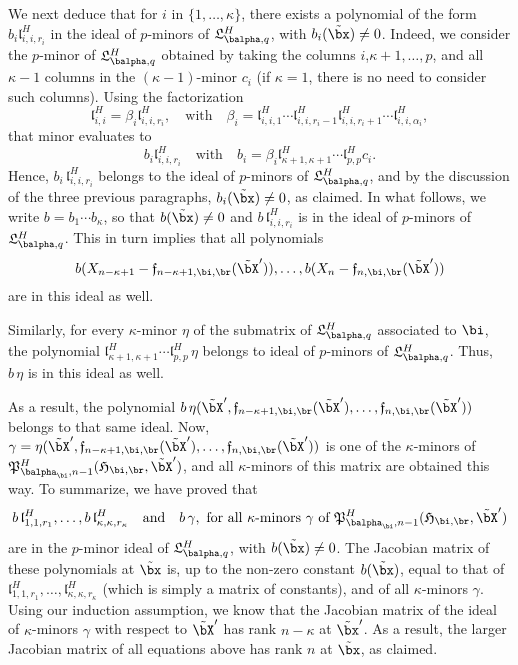 \documentclass[12pt]{article}
\begin{document}
We next deduce that for $i$ in $\{1,\dots,\kappa\}$, there exists a
polynomial of the form $b_{i} \mathfrak{l}^H_{i,i,r_i}$ in the ideal
of $p$-minors of $\mathfrak{L}^H_{\balpha,q}$, with
$b_{i}(\tilde\bx)\ne 0$. Indeed, we consider the $p$-minor of
$\mathfrak{L}^H_{\balpha,q}$ obtained by taking the columns
$i$,$\kappa+1,\dots,p$, and all $\kappa-1$ columns in the
$(\kappa-1)$-minor $c_i$ (if $\kappa=1$, there is no need to consider
such columns). Using the factorization
$$\mathfrak{l}^H_{i,i} = \beta_i \mathfrak{l}^H_{i,i,r_i},\quad\text{with}\quad
\beta_i=\mathfrak{l}^H_{i,i,1}\cdots \mathfrak{l}^H_{i,i,r_i-1}\mathfrak{l}^H_{i,i,r_i+1}\cdots \mathfrak{l}^H_{i,i,\alpha_i},$$
that minor evaluates to 
$$b_i \mathfrak{l}^H_{i,i,r_i}\quad\text{with}\quad b_i = \beta_i
\mathfrak{l}^H_{\kappa+1,\kappa+1}\cdots \mathfrak{l}^H_{p,p}c_i.$$
Hence, $b_i\, \mathfrak{l}^H_{i,i,r_i}$ belongs to the ideal of
$p$-minors of $\mathfrak{L}^H_{\balpha,q}$, and by the discussion of
the three previous paragraphs, $b_i(\tilde\bx)\ne 0$, as claimed. In
what follows, we write $b=b_1 \cdots b_\kappa$, so that $b(\tilde\bx)
\ne 0$ and $b\, \mathfrak{l}^H_{i,i,r_i}$ is in
the ideal of $p$-minors of 
$\mathfrak{L}^H_{\balpha,q}$.  This in turn implies that all
polynomials
$$
b(X_{n-\kappa+1}-\mathfrak{f}_{n-\kappa+1,\bi,\br}(\tilde\bX')),\dots,b(X_{n}-\mathfrak{f}_{n,\bi,\br}(\tilde\bX'))
$$ are in this ideal as well.

Similarly, for every $\kappa$-minor $\eta$ of the submatrix of
$\mathfrak{L}^H_{\balpha,q}$ associated to $\bi$, the polynomial
$\mathfrak{l}^H_{\kappa+1,\kappa+1}\cdots \mathfrak{l}^H_{p,p}\, \eta$
belongs to ideal of $p$-minors of $\mathfrak{L}^H_{\balpha,q}$. Thus,
$b \,\eta$ is in this ideal as well.

As a result, the polynomial $b\,
\eta(\tilde\bX',\mathfrak{f}_{n-\kappa+1,\bi,\br}(\tilde\bX'),\dots,\mathfrak{f}_{n,\bi,\br}(\tilde\bX'))$
belongs to that same ideal. Now,
$\gamma=\eta(\tilde\bX',\mathfrak{f}_{n-\kappa+1,\bi,\br}(\tilde\bX'),\dots,\mathfrak{f}_{n,\bi,\br}(\tilde\bX'))$
is one of the $\kappa$-minors of
$\mathfrak{P}^H_{\balpha_\bi,n-1}(\mathfrak{H}_{\bi,\br},\tilde\bX')$,
and all $\kappa$-minors of this matrix are obtained this way.  To
summarize, we have proved that
$$b\, \mathfrak{l}^H_{1,1,r_1},\dots,b\,
\mathfrak{l}^H_{\kappa,\kappa,r_\kappa} \quad\text{and}\quad b\,
\gamma, \text{~for all $\kappa$-minors $\gamma$ of
  $\mathfrak{P}^H_{\balpha_\bi,n-1}(\mathfrak{H}_{\bi,\br},\tilde\bX')$}$$
are in the $p$-minor ideal of 
 $\mathfrak{L}^H_{\balpha,q}$, with $b(\tilde\bx) \ne
0$. The Jacobian matrix of these polynomials at $\tilde\bx$ is, up to
the non-zero constant $b(\tilde\bx)$, equal to that of
$\mathfrak{l}^H_{1,1,r_1},\dots,
\mathfrak{l}^H_{\kappa,\kappa,r_\kappa}$ (which is simply a matrix of
constants), and of all $\kappa$-minors $\gamma$. Using our induction
assumption, we know that the Jacobian matrix of the ideal of
$\kappa$-minors $\gamma$ with respect to $\tilde\bX'$ has rank
$n-\kappa$ at $\tilde\bx'$. As a result, the larger Jacobian matrix of
all equations above has rank $n$ at $\tilde\bx$, as claimed.
\end{document}
